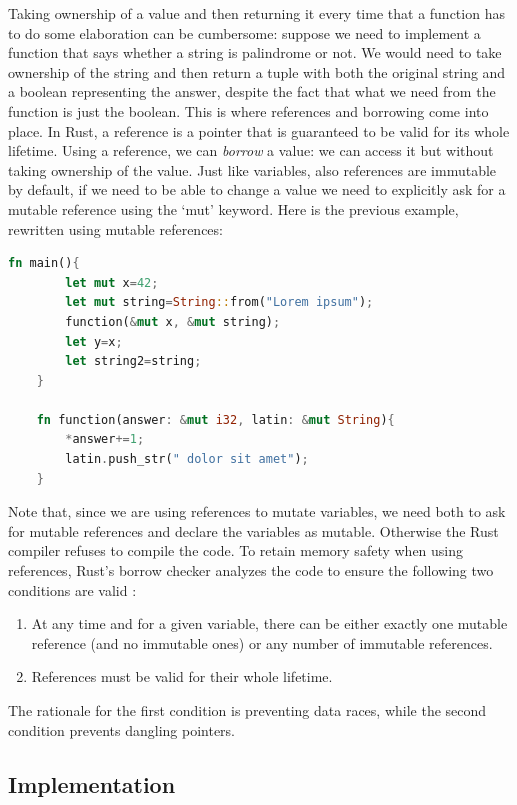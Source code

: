 \documentclass{report}
\begin{document}
Taking ownership of a value and then returning it every time that a function has to do some elaboration can be cumbersome: suppose we need to implement a function that says whether
a string is palindrome or not. We would need to take ownership of the string and then return a tuple with both the original string and a boolean representing the answer, despite
the fact that what we need from the function is just the boolean. This is where references and borrowing come into place. In Rust, a reference is a pointer that is guaranteed to be
valid for its whole lifetime. Using a reference, we can \textit{borrow} a value: we can access it but without taking ownership of the value. Just like variables, also references
are immutable by default, if we need to be able to change a value we need to explicitly ask for a mutable reference using the \enquote*{mut} keyword. Here is the previous example,
rewritten using mutable references:
\begin{lstlisting}[language=Rust, style=colouredRust]
    fn main(){
       	let mut x=42;
        let mut string=String::from("Lorem ipsum");
        function(&mut x, &mut string);
        let y=x;
        let string2=string;
    }

    fn function(answer: &mut i32, latin: &mut String){
       	*answer+=1;
        latin.push_str(" dolor sit amet");
    }	
\end{lstlisting}

Note that, since we are using references to mutate variables, we need both to ask for mutable references and declare the variables as mutable. Otherwise the Rust compiler refuses
to compile the code. To retain memory safety when using references, Rust's borrow checker analyzes the code to ensure the following two conditions are valid
\cite{rust_ownership_rules}:

\begin{enumerate}
		\item At any time and for a given variable, there can be either exactly one mutable reference (and no immutable ones) or any number of immutable references.
		\item References must be valid for their whole lifetime.
\end{enumerate}

The rationale for the first condition is preventing data races, while the second condition prevents dangling pointers.

\subsection{Implementation} 
\end{document}
